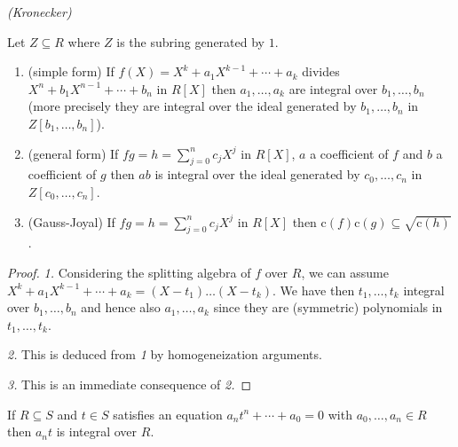 \documentclass[11pt,a4paper,twoside]{article}
\newcommand{\rc}{\mathrm{c}}
\begin{document}
\begin{lemma}\label{kronecker} \emph{(Kronecker)}

\noindent  Let $Z\subseteq R$ where $Z$
is the subring generated by $1$.
%
\begin{enumerate}
%
\item (simple form) If $f(X)=X^k+a_1X^{k-1}+ \cdots+a_k$ divides $X^n+b_1X^{n-1}+ \cdots + b_n$ in $R[X]$ then
$a_1,\dots,a_k$ are integral over $b_1,\dots, b_n$
(more precisely they are integral over the ideal generated by $b_1,\dots, b_n$
in  $Z[b_1,\dots, b_n]$).
%
\item (general form) If $fg=h=\sum_{j=0}^nc_jX^j$ in $R[X]$, $a$ a coefficient of $f$
and $b$ a coefficient of $g$ then $ab$ is integral over the ideal generated by $c_0,\dots, c_n$
in  $Z[c_0,\dots, c_n]$.
%
\item (Gauss-Joyal) If $fg=h=\sum_{j=0}^nc_jX^j$ in $R[X]$ then $\rc(f)\rc(g)\subseteq \sqrt{\rc(h)}$.
%
\end{enumerate}

\end{lemma}

\begin{proof} \emph{1.}
Considering the splitting algebra of $f$ over $R$, we can assume $X^k+a_1X^{k-1}+ \cdots+a_k = (X-t_1)\dots (X-t_k)$. We have
then $t_1,\dots,t_k$  integral over $b_1,\dots, b_n$ and hence also
$a_1,\dots,a_k$ since they are (symmetric) polynomials in $t_1,\dots,t_k$.

\noindent \emph{2.} This is deduced from \emph{1} by homogeneization arguments.

\noindent \emph{3.} This is an immediate consequence of \emph{2.}
\end{proof}



\begin{lemma}\label{basicEmmanuel}
If $R\subseteq S$ and $t\in S$ satisfies an equation $a_nt^n+ \cdots + a_0 = 0$
with $a_0,\dots,a_n\in R$ then $a_nt$ is integral over $R$.
\end{lemma}

\end{document}
